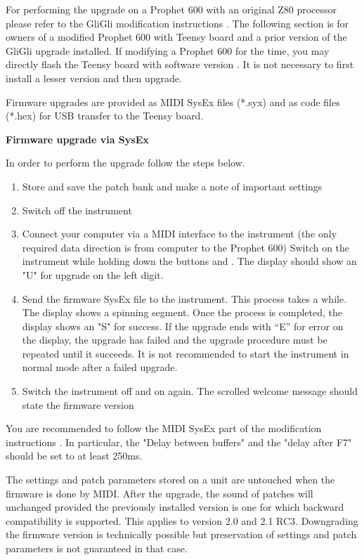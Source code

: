 For performing the upgrade on a Prophet 600 with an original Z80 processor please refer to the GliGli modification instructions \cite{modinstructions}. The following section is for owners of a modified Prophet 600 with Teensy board and a prior version of the GliGli upgrade installed. If modifying a Prophet 600 for the time, you may directly flash the Teensy board with software version \version. It is not necessary to first install a lesser version and then upgrade.

Firmware upgrades are provided as MIDI SysEx files (*.syx) and as code files (*.hex) for USB transfer to the Teensy board. 

\textbf{Firmware upgrade via SysEx}

In order to perform the upgrade follow the steps below.

\begin{enumerate}
  \setlength\itemsep{0cm}
  \item Store and save the patch bank and make a note of important settings
  \item Switch off the instrument
  \item Connect your computer via a MIDI interface to the instrument (the only required data direction is from computer to the Prophet 600) 
  Switch on the instrument while holding down the buttons \totape and \fromtape. The display should show an "U" for upgrade on the left digit.
  \item Send the firmware SysEx file to the instrument. This process takes a while. The display shows a spinning segment. Once the process is completed, the display shows an "S" for success. If the upgrade ends with “E” for error on the display, the upgrade has failed and the upgrade procedure must be repeated until it succeeds. It is not recommended to start the instrument in normal mode after a failed upgrade.
  \item Switch the instrument off and on again. The scrolled welcome message should state the firmware version 
\end{enumerate}

You are recommended to follow the MIDI SysEx part of the modification instructions \cite{modinstructions}. In particular, the "Delay between buffers" and the "delay after F7" should be set to at least 250ms.

The settings and patch parameters stored on a unit are untouched when the firmware is done by MIDI. After the upgrade, the sound of patches will unchanged provided the previously installed version is one for which backward compatibility is supported. This applies to version 2.0 and 2.1 RC3. Downgrading the firmware version is technically possible but preservation of settings and patch parameters is not guaranteed in that case.

